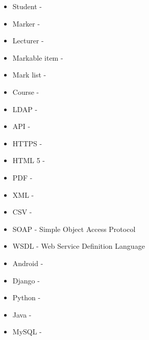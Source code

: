 \documentclass[12pt]{article}
\begin{document}
		\vspace{0.2in}
		\begin{itemize}
			\item Student -
			\item Marker -
			\item Lecturer -
			
			\item Markable item -
			\item Mark list -			
			\item Course -
			
			\item LDAP -
			\item API -			
			\item HTTPS -
			\item HTML 5 -
			\item PDF -
			\item XML -
			\item CSV -			
			\item SOAP - Simple Object Access Protocol	
			\item WSDL - Web Service Definition Language
			\item Android -
			\item Django -
			\item Python -
			\item Java -
			\item MySQL -
		\end{itemize}
			
	
	
\end{document}

